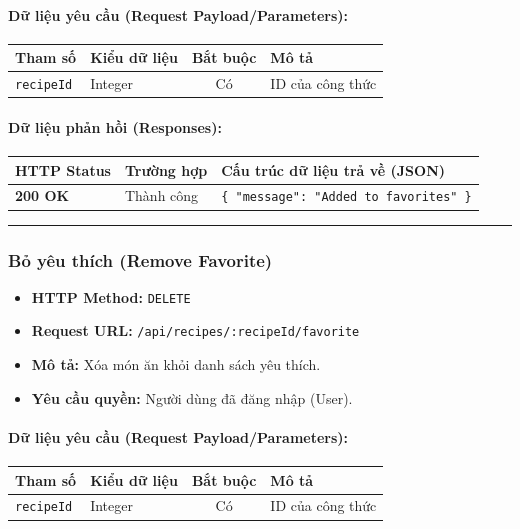 \documentclass[12pt,a4paper]{article}
\begin{document}
\paragraph{Dữ liệu yêu cầu (Request Payload/Parameters):}
\begin{longtable}{|>{\raggedright\arraybackslash}p{2.8cm}|>{\raggedright\arraybackslash}p{2.2cm}|c|>{\raggedright\arraybackslash}p{7.0cm}|}
\hline
\textbf{Tham số} & \textbf{Kiểu dữ liệu} & \textbf{Bắt buộc} & \textbf{Mô tả} \\ \hline
\endhead
\texttt{recipeId} & Integer & Có & ID của công thức \\ \hline
\end{longtable}

\paragraph{Dữ liệu phản hồi (Responses):}
\begin{longtable}{|>{\raggedright\arraybackslash}p{2.8cm}|>{\raggedright\arraybackslash}p{3.2cm}|>{\raggedright\arraybackslash}p{8.0cm}|}
\hline
\textbf{HTTP Status} & \textbf{Trường hợp} & \textbf{Cấu trúc dữ liệu trả về (JSON)} \\ \hline
\endhead
\textbf{200 OK} & Thành công & \texttt{\{ "message": "Added to favorites" \}} \\ \hline
\end{longtable}

\vskip 0.4cm
\noindent\rule{\textwidth}{0.3pt}
\vskip 0.4cm

\subsubsection{Bỏ yêu thích (Remove Favorite)}
\begin{itemize}[leftmargin=*]
    \item \textbf{HTTP Method:} \texttt{DELETE}
    \item \textbf{Request URL:} \texttt{/api/recipes/:recipeId/favorite}
    \item \textbf{Mô tả:} Xóa món ăn khỏi danh sách yêu thích.
    \item \textbf{Yêu cầu quyền:} Người dùng đã đăng nhập (User).
\end{itemize}

\paragraph{Dữ liệu yêu cầu (Request Payload/Parameters):}
\begin{longtable}{|>{\raggedright\arraybackslash}p{2.8cm}|>{\raggedright\arraybackslash}p{2.2cm}|c|>{\raggedright\arraybackslash}p{7.0cm}|}
\hline
\textbf{Tham số} & \textbf{Kiểu dữ liệu} & \textbf{Bắt buộc} & \textbf{Mô tả} \\ \hline
\endhead
\texttt{recipeId} & Integer & Có & ID của công thức \\ \hline
\end{longtable}
\end{document}
